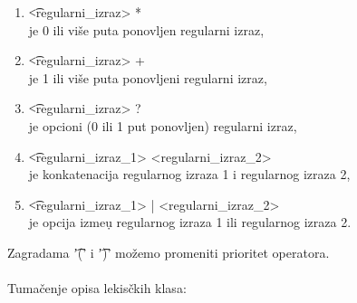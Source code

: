       \begin{enumerate}
        \item
        {
          \t{<regularni\_izraz> *}\\
          je 0 ili vi\v se puta ponovljen regularni izraz,
        }
        \item
        {
          \t{<regularni\_izraz> +}\\
          je 1 ili vi\v se puta ponovljeni regularni izraz,
        }
        \item
        {
          \t{<regularni\_izraz> ?}\\
          je opcioni (0 ili 1 put ponovljen) regularni izraz,
        }
        \item
        {
          \t{<regularni\_izraz\_1> <regularni\_izraz\_2>}\\
          je konkatenacija regularnog izraza 1 i regularnog izraza 2,
        }
        \item
        {
          \t{<regularni\_izraz\_1> | <regularni\_izraz\_2>}\\
          je opcija izme\d u regularnog izraza 1 ili regularnog izraza 2.
        }
      \end{enumerate}
      Zagradama \t{'('} i \t{')'} mo\v zemo promeniti prioritet operatora.\\
      \\
      Tuma\v cenje opisa lekis\v ckih klasa:
